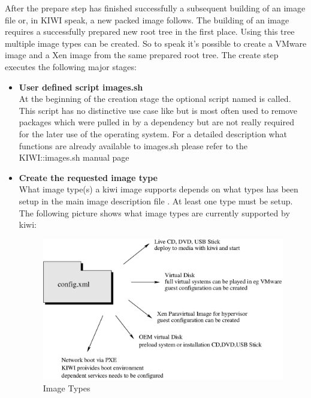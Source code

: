 After the prepare step has finished successfully a subsequent building of
an image file or, in KIWI speak, a new packed image follows.
The building of an image requires a successfully prepared new root
tree in the first place. Using this tree multiple image types can be
created. So to speak it's possible to create a VMware image and a
Xen image from the same prepared root tree. The create step executes the
following major stages:

\begin{itemize}
\item \textbf{User defined script images.sh}\\
      At the beginning of the creation stage the optional script named
       is called. This script has no distinctive use case like
       but is most often used to remove packages which were pulled
      in by a dependency but are not really required for the later use
      of the operating system. For a detailed description what
      functions are already available to images.sh please refer to
      the KIWI::images.sh manual page
\item \textbf{Create the requested image type}\\
      What image type(s) a kiwi image supports depends on what types has been
      setup in the main image description file . At least one type
      must be setup. The following picture shows what image types are
      currently supported by kiwi:

      \begin{figure}[h]
      \centering
      \includegraphics[scale=0.5]{pictures/types.eps}
      \caption{Image Types}
      \label{fig:types}
      \end{figure}
\end{itemize}

